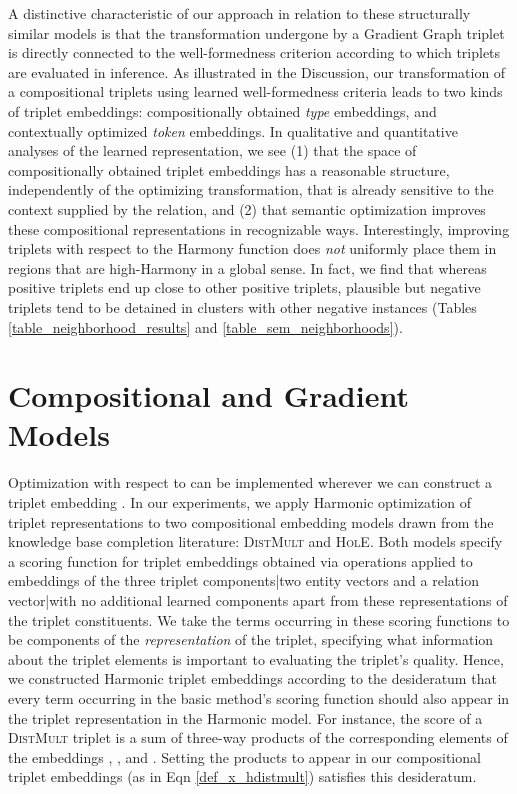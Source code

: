 \documentclass[a4paper,10pt]{article}
\begin{document}
A distinctive characteristic of our approach in relation to these structurally similar models is that the transformation undergone by a Gradient Graph triplet is directly connected to the well-formedness criterion according to which triplets are evaluated in inference. As illustrated in the Discussion, our transformation of a compositional triplets using learned well-formedness criteria leads to two kinds of triplet embeddings: compositionally obtained \emph{type} embeddings, and contextually optimized \emph{token} embeddings. In qualitative and quantitative analyses of the learned representation, we see (1) that the space of compositionally obtained triplet embeddings has a reasonable structure, independently of the optimizing transformation, that is already sensitive to the context supplied by the relation, and (2) that semantic optimization improves these compositional representations in recognizable ways. Interestingly, improving triplets with respect to the Harmony function does \emph{not} uniformly place them in regions that are high-Harmony in a global sense. In fact, we find that whereas positive triplets end up close to other positive triplets, plausible but negative triplets tend to be detained in clusters with other negative instances (Tables \ref{table_neighborhood_results} and \ref{table_sem_neighborhoods}). 

\section{Compositional and Gradient Models} \label{sec_models}

Optimization with respect to  can be implemented wherever we can construct a triplet embedding . In our experiments, we apply Harmonic optimization of triplet representations to two compositional embedding models drawn from the knowledge base completion literature: \textsc{DistMult} and \textsc{HolE}. Both models specify a scoring function for triplet embeddings obtained via operations applied to embeddings of the three triplet components|two entity vectors and a relation vector|with no additional learned components apart from these representations of the triplet constituents. We take the terms occurring in these scoring functions to be components of the \emph{representation} of the triplet, specifying what information about the triplet elements is important to evaluating the triplet's quality. Hence, we constructed Harmonic triplet embeddings according to the desideratum that every term occurring in the basic method's scoring function should also appear in the triplet representation  in the Harmonic model. 
For instance, the score of a \textsc{DistMult} triplet is a sum of three-way products of the corresponding elements of the embeddings , , and . Setting the products  to appear in our compositional triplet embeddings (as in Eqn \ref{def_x_hdistmult}) satisfies this desideratum. 
\end{document}
